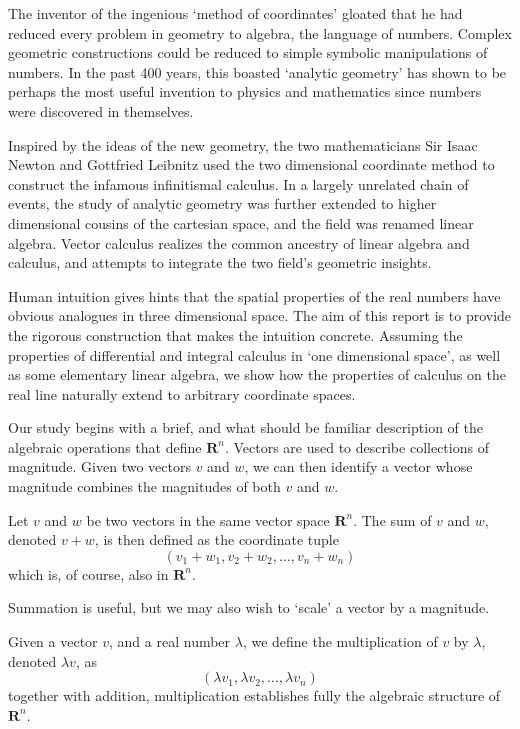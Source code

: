 The inventor of the ingenious `method of coordinates' gloated that he had reduced every problem in geometry to algebra, the language of numbers. Complex geometric constructions could be reduced to simple symbolic manipulations of numbers. In the past 400 years, this boasted `analytic geometry' has shown to be perhaps the most useful invention to physics and mathematics since numbers were discovered in themselves.

Inspired by the ideas of the new geometry, the two mathematicians Sir Isaac Newton and Gottfried Leibnitz used the two dimensional coordinate method to construct the infamous infinitismal calculus. In a largely unrelated chain of events, the study of analytic geometry was further extended to higher dimensional cousins of the cartesian space, and the field was renamed linear algebra. Vector calculus realizes the common ancestry of linear algebra and calculus, and attempts to integrate the two field's geometric insights.

Human intuition gives hints that the spatial properties of the real numbers have obvious analogues in three dimensional space. The aim of this report is to provide the rigorous construction that makes the intuition concrete. Assuming the properties of differential and integral calculus in `one dimensional space', as well as some elementary linear algebra, we show how the properties of calculus on the real line naturally extend to arbitrary coordinate spaces.

Our study begins with a brief, and what should be familiar description of the algebraic operations that define $\mathbf{R}^n$. Vectors are used to describe collections of magnitude. Given two vectors $v$ and $w$, we can then identify a vector whose magnitude combines the magnitudes of both $v$ and $w$.

\begin{definition}
  Let $v$ and $w$ be two vectors in the same vector space $\mathbf{R}^n$. The sum of $v$ and $w$, denoted $v + w$, is then defined as the coordinate tuple
  \[ (v_1 + w_1, v_2 + w_2, \dots, v_n + w_n) \]
  which is, of course, also in $\mathbf{R}^n$.
\end{definition}

Summation is useful, but we may also wish to `scale' a vector by a magnitude.

\begin{definition}
  Given a vector $v$, and a real number $\lambda$, we define the multiplication of $v$ by $\lambda$, denoted $\lambda v$, as
  \[ (\lambda v_1, \lambda v_2, \dots, \lambda v_n) \]
  together with addition, multiplication establishes fully the algebraic structure of $\mathbf{R}^n$.
\end{definition}

